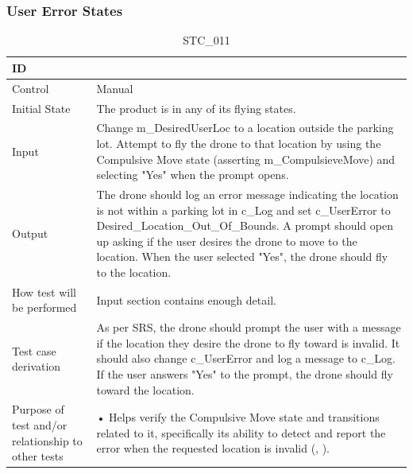 \documentclass[12pt, titlepage]{article}
\begin{document}
\clearpage

\subsubsection{User Error States}
\label{usererrorTests}

\begin{table}[!h]
\begin{center}
\caption {STC\_011}
\label{tab:STC_011}
\begin{tabular}{ | m{1.5cm} | m{15cm} | } 
\hline
ID & \nameref{tab:STC_011} \\ 
\hline
Control & Manual \\ 
\hline
Initial State & The product is in any of its flying states.   \\ 
\hline
Input & Change m\_DesiredUserLoc to a location outside the parking lot. Attempt to fly the drone to that location by using the Compulsive Move state (asserting m\_CompulsieveMove) and selecting "Yes" when the prompt opens.  \\ 
\hline
Output & The drone should log an error message indicating the location is not within a parking lot in  c\_Log and set c\_UserError to Desired\_Location\_Out\_Of\_Bounds. A prompt should open up asking if the user desires the drone to move to the location. When the user selected "Yes", the drone should fly to the location. \\

\hline
How test will be performed & Input section contains enough detail. \\ 
\hline
Test case derivation & As per SRS, the drone should prompt the user with a message if the location they desire the drone to fly toward is invalid. It should also change c\_UserError and log a message to c\_Log. If the user answers "Yes" to the prompt, the drone should fly toward the location.  

 \\ 
\hline
Purpose of test and/or relationship to other tests & 

• Helps verify the Compulsive Move state and transitions related to it, specifically its ability to detect and report the error when the requested location is invalid (\nameref{STA_013}, \nameref{TRANS_005}).
\\ 
\hline
\end{tabular}
\end{center}
\end{table}
\end{document}
